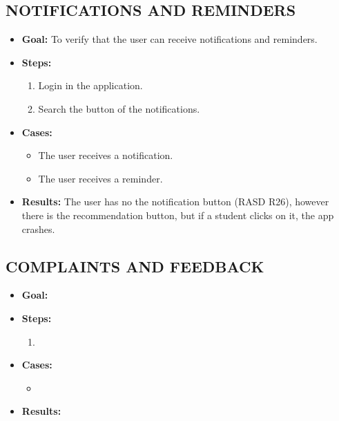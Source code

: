 \subsection{NOTIFICATIONS AND REMINDERS}\label{subsec:notifications-and-reminders}
\begin{itemize}
    \item \textbf{Goal:} To verify that the user can receive notifications and reminders.

    \item \textbf{Steps:}
    \begin{enumerate}
        \item Login in the application.
        \item Search the button of the notifications.
    \end{enumerate}
    \item \textbf{Cases:}
    \begin{itemize}
        \item The user receives a notification.
        \item The user receives a reminder.
    \end{itemize}
    \item \textbf{Results:}
    The user has no the notification button (RASD R26),
    however there is the recommendation button, but if a student clicks on it, the app crashes.

\end{itemize}

\subsection{COMPLAINTS AND FEEDBACK}\label{subsec:complaints-and-feedback}
\begin{itemize}
    \item \textbf{Goal:}

    \item \textbf{Steps:}
    \begin{enumerate}
        \item

    \end{enumerate}
    \item \textbf{Cases:}
    \begin{itemize}
        \item
    \end{itemize}
    \item \textbf{Results:}

\end{itemize}

